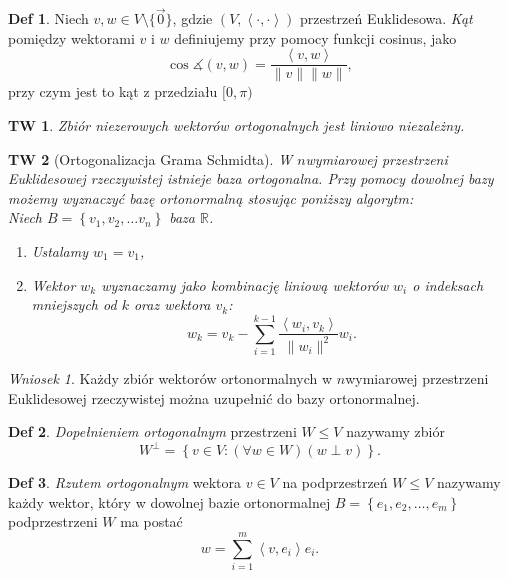 \documentclass[a4paper, 12pt]{mwart}
\theoremstyle{definition}
\newtheorem{definicja}{Def}[section]
\theoremstyle{plain}
\newtheorem{twierdzenie}{TW}[section]
\theoremstyle{remark}
\newtheorem{wniosek}{Wniosek}[section]
\begin{document}
\begin{definicja}
	Niech $v, w \in V \setminus \{\vec 0\}$, gdzie $\left(V, \left< \cdot, \cdot \right> \right)$ \ppauza przestrzeń Euklidesowa. \emph{Kąt} pomiędzy wektorami $v$ i $w$ definiujemy przy pomocy funkcji cosinus, jako
	\begin{equation}
		\cos \measuredangle (v, w) = \frac{\left< v, w \right> }{\|v\| \|w\|},
	\end{equation}
	przy czym jest to kąt z przedziału $[0, \pi)$
\end{definicja}
\begin{twierdzenie}
	Zbiór niezerowych wektorów ortogonalnych jest liniowo niezależny.
\end{twierdzenie}
\begin{twierdzenie}[Ortogonalizacja Grama \ppauza Schmidta]
	W $n$\dywiz wymiarowej przestrzeni Euklidesowej rzeczywistej istnieje baza ortogonalna. Przy pomocy dowolnej bazy możemy wyznaczyć bazę ortonormalną stosując poniższy algorytm: \\
	Niech $B = \left\{v_1, v_2, \ldots v_n\right\}$ \ppauza baza $\mathbb{R}$.
	\begin{enumerate}
		\item Ustalamy $w_1 = v_1$,
		\item Wektor $w_k$ wyznaczamy jako kombinację liniową wektorów $w_i$ o indeksach mniejszych od $k$ oraz wektora $v_k$:
		\begin{equation}
			w_k = v_k - \sum_{i=1}^{k-1} \frac{\left<w_i, v_k \right>}{\|w_i\|^2} w_i.
		\end{equation}
	\end{enumerate}
\end{twierdzenie}
\begin{wniosek}
	Każdy zbiór wektorów ortonormalnych w $n$\dywiz wymiarowej przestrzeni Euklidesowej rzeczywistej można uzupełnić do bazy ortonormalnej.
\end{wniosek}
\begin{definicja}
	\emph{Dopełnieniem ortogonalnym} przestrzeni $W \leq V$ nazywamy zbiór
	\begin{equation}
		W^\perp = \left\{v \in V: \left(\forall w \in W\right)\left(w \perp v\right)\right\}.
	\end{equation}
\end{definicja}
\begin{definicja}
	\emph{Rzutem ortogonalnym} wektora $v \in V$ na podprzestrzeń $W \leq V$ nazywamy każdy wektor, który w dowolnej bazie ortonormalnej $B = \left\{e_1, e_2, \ldots, e_m\right\}$ podprzestrzeni $W$ ma postać
	\begin{equation}
		w = \sum_{i=1}^{m} \left< v, e_i \right> e_i.
	\end{equation}
\end{definicja}
\end{document}
